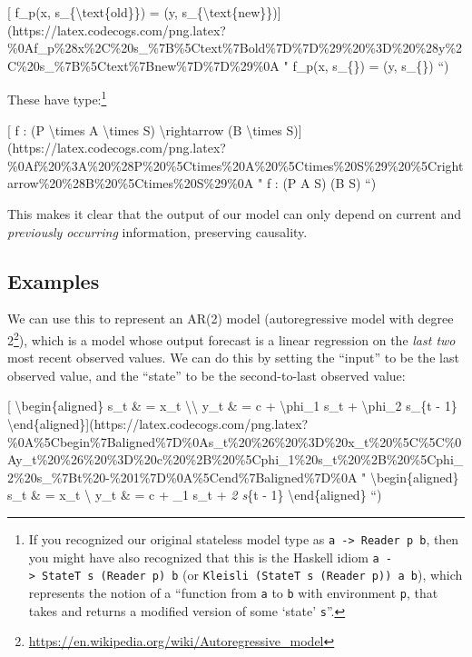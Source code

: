 \documentclass[]{article}
\renewcommand{\href}[2]{#2\footnote{\url{#1}}}
\begin{document}
{[} f\_p(x, s\_\{\textbackslash{}text\{old\}\}) = (y,
s\_\{\textbackslash{}text\{new\}\}){]}(https://latex.codecogs.com/png.latex?\%0Af\_p\%28x\%2C\%20s\_\%7B\%5Ctext\%7Bold\%7D\%7D\%29\%20\%3D\%20\%28y\%2C\%20s\_\%7B\%5Ctext\%7Bnew\%7D\%7D\%29\%0A
" f\_p(x, s\_\{\}) = (y, s\_\{\}) ``)

These have type:\footnote{If you recognized our original stateless model type as
  \texttt{a\ -\textgreater{}\ Reader\ p\ b}, then you might have also recognized
  that this is the Haskell idiom
  \texttt{a\ -\textgreater{}\ StateT\ s\ (Reader\ p)\ b} (or
  \texttt{Kleisli\ (StateT\ s\ (Reader\ p))\ a\ b}), which represents the notion
  of a ``function from \texttt{a} to \texttt{b} with environment \texttt{p},
  that takes and returns a modified version of some `state' \texttt{s}''.}

{[} f : (P \textbackslash{}times A \textbackslash{}times S)
\textbackslash{}rightarrow (B \textbackslash{}times
S){]}(https://latex.codecogs.com/png.latex?\%0Af\%20\%3A\%20\%28P\%20\%5Ctimes\%20A\%20\%5Ctimes\%20S\%29\%20\%5Crightarrow\%20\%28B\%20\%5Ctimes\%20S\%29\%0A
" f : (P \times A \times S) \rightarrow (B \times S) ``)

This makes it clear that the output of our model can only depend on current and
\emph{previously occurring} information, preserving causality.

\hypertarget{examples}{%
\subsection{Examples}\label{examples}}

We can use this to represent an AR(2) model
(\href{https://en.wikipedia.org/wiki/Autoregressive_model}{autoregressive model
with degree 2}), which is a model whose output forecast is a linear regression
on the \emph{last two} most recent observed values. We can do this by setting
the ``input'' to be the last observed value, and the ``state'' to be the
second-to-last observed value:

{[} \textbackslash{}begin\{aligned\} s\_t \& = x\_t
\textbackslash{}\textbackslash{} y\_t \& = c + \textbackslash{}phi\_1 s\_t +
\textbackslash{}phi\_2 s\_\{t - 1\}
\textbackslash{}end\{aligned\}{]}(https://latex.codecogs.com/png.latex?\%0A\%5Cbegin\%7Baligned\%7D\%0As\_t\%20\%26\%20\%3D\%20x\_t\%20\%5C\%5C\%0Ay\_t\%20\%26\%20\%3D\%20c\%20\%2B\%20\%5Cphi\_1\%20s\_t\%20\%2B\%20\%5Cphi\_2\%20s\_\%7Bt\%20-\%201\%7D\%0A\%5Cend\%7Baligned\%7D\%0A
" \textbackslash{}begin\{aligned\} s\_t \& = x\_t \textbackslash{} y\_t \& = c +
\phi\_1 s\_t + \phi\emph{2 s}\{t - 1\} \textbackslash{}end\{aligned\} ``)
\end{document}
